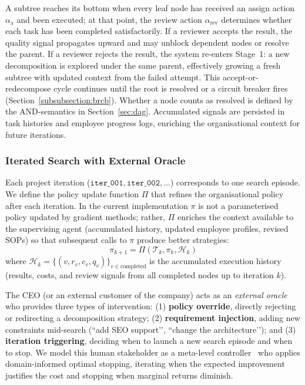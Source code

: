 \documentclass[11pt,a4paper]{article}
\begin{document}
A subtree reaches its bottom when every leaf node has received an assign action $\alpha_{\text{a}}$ and been executed; at that point, the review action $\alpha_{\text{rev}}$ determines whether each task has been completed satisfactorily.  If a reviewer accepts the result, the quality signal propagates upward and may unblock dependent nodes or resolve the parent.  If a reviewer rejects the result, the system re-enters Stage~1: a new decomposition is explored under the same parent, effectively growing a fresh subtree with updated context from the failed attempt.  This accept-or-redecompose cycle continues until the root is resolved or a circuit breaker fires (Section~\ref{subsubsection:brcb}).  Whether a node counts as resolved is defined by the AND-semantics in Section~\ref{sec:dag}.  Accumulated signals are persisted in task histories and employee progress logs, enriching the organisational context for future iterations.

\subsubsection{Iterated Search with External Oracle}

Each project iteration ($\texttt{iter\_001}, \texttt{iter\_002}, \ldots$) corresponds to one search episode.  We define the policy update function $\Pi$ that refines the organisational policy after each iteration.  In the current implementation $\pi$ is not a parameterised policy updated by gradient methods; rather, $\Pi$ enriches the context available to the supervising agent (accumulated history, updated employee profiles, revised SOPs) so that subsequent calls to $\pi$ produce better strategies:
\begin{equation}
\pi_{k+1} = \Pi(\mathcal{T}_k, \pi_k, \mathcal{H}_k)
\end{equation}
where $\mathcal{H}_k = \{(v, r_v, c_v, q_v)\}_{v \in \text{completed}}$ is the accumulated execution history (results, costs, and review signals from all completed nodes up to iteration $k$).

The CEO (or an external customer of the company) acts as an \emph{external oracle} who provides three types of intervention: (1) \textbf{policy override}, directly rejecting or redirecting a decomposition strategy; (2) \textbf{requirement injection}, adding new constraints mid-search (``add SEO support’’, ``change the architecture’’); and (3) \textbf{iteration triggering}, deciding when to launch a new search episode and when to stop. We model this human stakeholder as a meta-level controller~\cite{russell1991right} who applies domain-informed optimal stopping, iterating when the expected improvement justifies the cost and stopping when marginal returns diminish.
\end{document}
